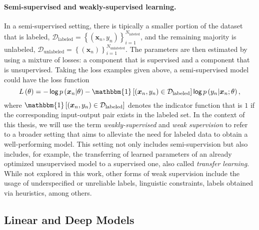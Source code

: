 \paragraph*{Semi-supervised and weakly-supervised learning.} In a
semi-supervised setting, there is tipically a smaller portion of the
dataset that is labeled,
$\mathcal{D}_{\text{labeled}}=
    \left\{(\bm{x}_n,y_n)\right\}_{i=1}^{N_{\text{labeled}}}$,
and the remaining majority is unlabeled,
$\mathcal{D}_{\text{unlabeled}}=
    \left\{(\bm{x}_n)\right\}_{i=1}^{N_{\text{unlabeled}}}$.
The parameters are then estimated by using a mixture of losses: a
component that is supervised and a component that is unsupervised.
Taking the loss examples given above, a semi-supervised model could
have the loss function
%
\begin{equation}
    L\left(\theta\right)=
    -\log p\left(\bm{x}_n|\theta\right)
    -\mathbbm{1}\left[(\bm{x}_n,y_n)\in\mathcal{D}_{\text{labeled}}\right]
    \log p\left(y_n|\bm{x}_n;\theta\right),
\end{equation}
%
%
where
$\mathbbm{1}\left[(\bm{x}_n,y_n)\in\mathcal{D}_{\text{labeled}}\right]$
denotes the indicator function that is $1$ if the corresponding
input-output pair exists in the labeled set. In the context of this
thesis, we will use the term \textit{weakly-supervised} and
\textit{weak supervision} to refer to a broader setting that aims to
alleviate the need for labeled data to obtain a well-performing
model. This setting not only includes semi-supervision but also
includes, for example, the transferring of learned parameters of an
already optimized unsupervised model to a supervised one, also called
\textit{transfer learning}. While not explored in this work, other
forms of weak supervision include the usage of underspecified or
unreliable labels, linguistic constraints, labels obtained via
heuristics, among others.

\subsection{Linear and Deep Models}

